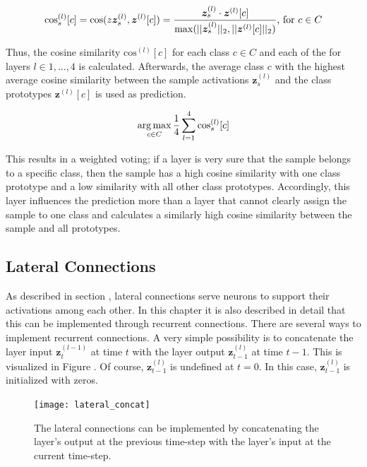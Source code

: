 \begin{equation}\eqlbl{vso_11}
		\text{cos}^{(l)}_s[c] = \text{cos}(z\boldsymbol{z}^{(l)}_s, \boldsymbol{z}^{(l)}[c]) = \frac{\boldsymbol{z}^{(l)}_s \cdot \boldsymbol{z}^{(l)}[c]}{\max(||\boldsymbol{z}^{(l)}_s||_2, ||\boldsymbol{z}^{(l)}[c]||_2)} \text{, for } c \in C
\end{equation}

Thus, the cosine similarity $\text{cos}^{(l)}[c]$ for each class $c \in C$ and each of the for layers $l \in {1, ..., 4}$ is calculated. Afterwards, the average class $c$ with the highest average cosine similarity between the sample activations $\boldsymbol{z}^{(l)}_s$ and the class prototypes $\boldsymbol{z}^{(l)}[c]$ is used as prediction.

\begin{equation}\eqlbl{vso_12}
		\argmax_{c \in C} \frac{1}{4} \sum_{l=1}^{4} \text{cos}^{(l)}_s[c]
\end{equation}

This results in a weighted voting; if a layer is very sure that the sample belongs to a specific class, then the sample has a high cosine similarity with one class prototype and a low similarity with all other class prototypes. Accordingly, this layer influences the prediction more than a layer that cannot clearly assign the sample to one class and calculates a similarly high cosine similarity between the sample and all prototypes.


\subsection{Lateral Connections}
As described in section , lateral connections serve neurons to support their activations among each other.
In this chapter it is also described in detail that this can be implemented through recurrent connections.
There are several ways to implement recurrent connections. A very simple possibility is to concatenate the layer input $\boldsymbol{z}^{(l-1)}_t$ at time $t$ with the layer output $\boldsymbol{z}^{(l)}_{t-1}$  at time $t-1$. This is visualized in Figure . Of course, $\boldsymbol{z}^{(l)}_{t-1}$ is undefined at $t=0$. In this case, $\boldsymbol{z}^{(l)}_{t-1}$ is initialized with zeros.

\begin{figure}[h]
    \centering
    \texttt{[image: lateral\_concat]}
    \caption[Lateral connections by concatenating the layer's output with the layer's input]{The lateral connections can be implemented by concatenating the layer's output at the previous time-step with the layer's input at the current time-step.}
\end{figure}


